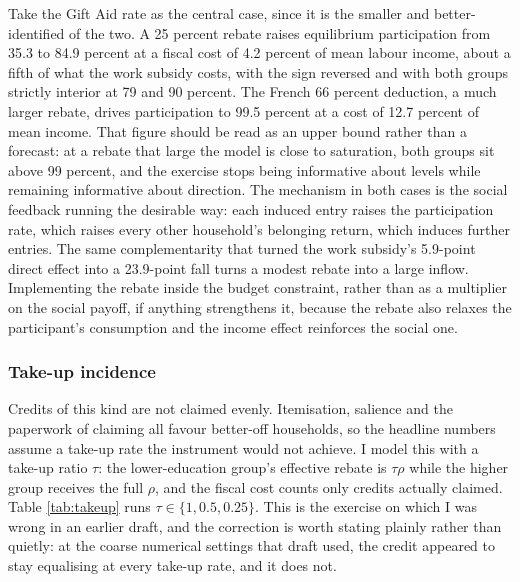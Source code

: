 \documentclass[11pt]{article}
\begin{document}
Take the Gift Aid rate as the central case, since it is the smaller and better-identified of the two. A 25 percent rebate raises equilibrium participation from 35.3 to 84.9 percent at a fiscal cost of 4.2 percent of mean labour income, about a fifth of what the work subsidy costs, with the sign reversed and with both groups strictly interior at 79 and 90 percent. The French 66 percent deduction, a much larger rebate, drives participation to 99.5 percent at a cost of 12.7 percent of mean income. That figure should be read as an upper bound rather than a forecast: at a rebate that large the model is close to saturation, both groups sit above 99 percent, and the exercise stops being informative about levels while remaining informative about direction. The mechanism in both cases is the social feedback running the desirable way: each induced entry raises the participation rate, which raises every other household's belonging return, which induces further entries. The same complementarity that turned the work subsidy's 5.9-point direct effect into a 23.9-point fall turns a modest rebate into a large inflow. Implementing the rebate inside the budget constraint, rather than as a multiplier on the social payoff, if anything strengthens it, because the rebate also relaxes the participant's consumption and the income effect reinforces the social one.

\subsubsection*{Take-up incidence}

Credits of this kind are not claimed evenly. Itemisation, salience and the paperwork of claiming all favour better-off households, so the headline numbers assume a take-up rate the instrument would not achieve. I model this with a take-up ratio $\tau$: the lower-education group's effective rebate is $\tau \rho$ while the higher group receives the full $\rho$, and the fiscal cost counts only credits actually claimed. Table \ref{tab:takeup} runs $\tau \in \{1, 0.5, 0.25\}$. This is the exercise on which I was wrong in an earlier draft, and the correction is worth stating plainly rather than quietly: at the coarse numerical settings that draft used, the credit appeared to stay equalising at every take-up rate, and it does not.
\end{document}
